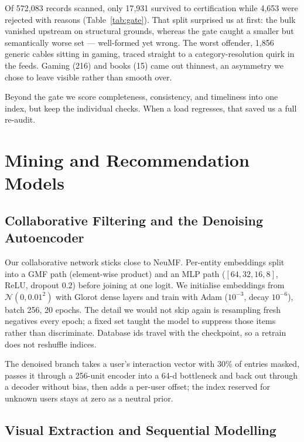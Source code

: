 \documentclass[conference]{IEEEtran}
\begin{document}
Of 572{,}083 records scanned, only 17{,}931 survived to certification while 4{,}653
were rejected with reasons (Table~\ref{tab:gate}). That split surprised us at first:
the bulk vanished upstream on structural grounds, whereas the gate caught a smaller
but semantically worse set --- well-formed yet wrong. The worst offender, 1{,}856
generic cables sitting in gaming, traced straight to a category-resolution quirk in
the feeds. Gaming (216) and books (15) came out thinnest, an asymmetry we chose to
leave visible rather than smooth over.

Beyond the gate we score completeness, consistency, and timeliness into one index,
but keep the individual checks. When a load regresses, that saved us a full re-audit.

\section{Mining and Recommendation Models}
\label{sec:models}

\subsection{Collaborative Filtering and the Denoising Autoencoder}

Our collaborative network sticks close to NeuMF. Per-entity embeddings split into a
GMF path (element-wise product) and an MLP path ($[64,32,16,8]$, ReLU, dropout
$0.2$) before joining at one logit. We initialise embeddings from
$\mathcal{N}(0,0.01^2)$ with Glorot dense layers and train with Adam ($10^{-3}$,
decay $10^{-6}$), batch 256, 20 epochs. The detail we would not skip again is
resampling fresh negatives every epoch; a fixed set taught the model to suppress
those items rather than discriminate. Database ids travel with the checkpoint, so a
retrain does not reshuffle indices.

The denoised branch takes a user's interaction vector with 30\% of entries masked,
passes it through a 256-unit encoder into a 64-d bottleneck and back out through
a decoder without bias, then adds a per-user offset; the index reserved for
unknown users stays at zero as a neutral prior.

\subsection{Visual Extraction and Sequential Modelling}
\end{document}
